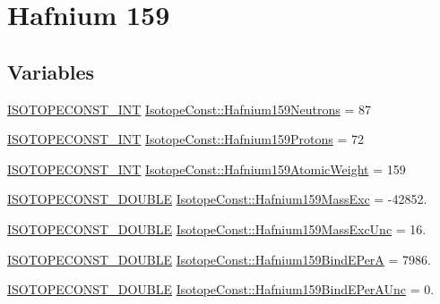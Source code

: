 \hypertarget{group___isotope_const-_hafnium-_hf159}{}\section{Hafnium 159}
\label{group___isotope_const-_hafnium-_hf159}
\subsection*{Variables}
\begin{DoxyCompactItemize}
\item 
\mbox{\hyperlink{group___isotope_const-_macros_ga5f18360b3e99483a35c32d789e62621c}{I\+S\+O\+T\+O\+P\+E\+C\+O\+N\+S\+T\+\_\+\+I\+NT}} \mbox{\hyperlink{group___isotope_const-_hafnium-_hf159_ga6bc10ec559a44471b781304f68354cbe}{Isotope\+Const\+::\+Hafnium159\+Neutrons}} = 87
\item 
\mbox{\hyperlink{group___isotope_const-_macros_ga5f18360b3e99483a35c32d789e62621c}{I\+S\+O\+T\+O\+P\+E\+C\+O\+N\+S\+T\+\_\+\+I\+NT}} \mbox{\hyperlink{group___isotope_const-_hafnium-_hf159_gaac022a447d3fef4f0748291a81256630}{Isotope\+Const\+::\+Hafnium159\+Protons}} = 72
\item 
\mbox{\hyperlink{group___isotope_const-_macros_ga5f18360b3e99483a35c32d789e62621c}{I\+S\+O\+T\+O\+P\+E\+C\+O\+N\+S\+T\+\_\+\+I\+NT}} \mbox{\hyperlink{group___isotope_const-_hafnium-_hf159_gaa50fd8afd82bc24ee40ead354ed8e7fc}{Isotope\+Const\+::\+Hafnium159\+Atomic\+Weight}} = 159
\item 
\mbox{\hyperlink{group___isotope_const-_macros_ga8f45a7272ce02c0b4c65c44636ed719a}{I\+S\+O\+T\+O\+P\+E\+C\+O\+N\+S\+T\+\_\+\+D\+O\+U\+B\+LE}} \mbox{\hyperlink{group___isotope_const-_hafnium-_hf159_ga7d25f39987789054df75a69780a55f21}{Isotope\+Const\+::\+Hafnium159\+Mass\+Exc}} = -\/42852.
\item 
\mbox{\hyperlink{group___isotope_const-_macros_ga8f45a7272ce02c0b4c65c44636ed719a}{I\+S\+O\+T\+O\+P\+E\+C\+O\+N\+S\+T\+\_\+\+D\+O\+U\+B\+LE}} \mbox{\hyperlink{group___isotope_const-_hafnium-_hf159_ga0327246825476beb5da9c3f7176cfa91}{Isotope\+Const\+::\+Hafnium159\+Mass\+Exc\+Unc}} = 16.
\item 
\mbox{\hyperlink{group___isotope_const-_macros_ga8f45a7272ce02c0b4c65c44636ed719a}{I\+S\+O\+T\+O\+P\+E\+C\+O\+N\+S\+T\+\_\+\+D\+O\+U\+B\+LE}} \mbox{\hyperlink{group___isotope_const-_hafnium-_hf159_ga7e8451f2ffe299a99958e2673b7ca943}{Isotope\+Const\+::\+Hafnium159\+Bind\+E\+PerA}} = 7986.
\item 
\mbox{\hyperlink{group___isotope_const-_macros_ga8f45a7272ce02c0b4c65c44636ed719a}{I\+S\+O\+T\+O\+P\+E\+C\+O\+N\+S\+T\+\_\+\+D\+O\+U\+B\+LE}} \mbox{\hyperlink{group___isotope_const-_hafnium-_hf159_ga1263dff4787e1e9b218e6e75a96c1330}{Isotope\+Const\+::\+Hafnium159\+Bind\+E\+Per\+A\+Unc}} = 0.

\end{DoxyCompactItemize}
